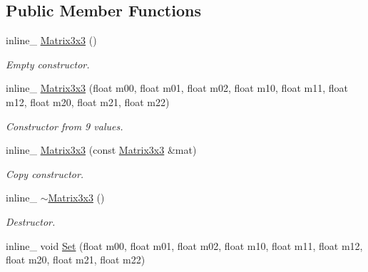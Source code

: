 \subsection*{Public Member Functions}
\begin{DoxyCompactItemize}
\item 
inline\+\_\+ \hyperlink{classOpcode_1_1Matrix3x3_ae41096c213798561be72fc6445343dc2}{Matrix3x3} ()\hypertarget{classOpcode_1_1Matrix3x3_ae41096c213798561be72fc6445343dc2}{}\label{classOpcode_1_1Matrix3x3_ae41096c213798561be72fc6445343dc2}

\begin{DoxyCompactList}\small\item\em Empty constructor. \end{DoxyCompactList}\item 
inline\+\_\+ \hyperlink{classOpcode_1_1Matrix3x3_ab43ae449591252976f7c528e7da5e008}{Matrix3x3} (float m00, float m01, float m02, float m10, float m11, float m12, float m20, float m21, float m22)\hypertarget{classOpcode_1_1Matrix3x3_ab43ae449591252976f7c528e7da5e008}{}\label{classOpcode_1_1Matrix3x3_ab43ae449591252976f7c528e7da5e008}

\begin{DoxyCompactList}\small\item\em Constructor from 9 values. \end{DoxyCompactList}\item 
inline\+\_\+ \hyperlink{classOpcode_1_1Matrix3x3_a1a094bb5a722baa07ef3785b36131be9}{Matrix3x3} (const \hyperlink{classOpcode_1_1Matrix3x3}{Matrix3x3} \&mat)\hypertarget{classOpcode_1_1Matrix3x3_a1a094bb5a722baa07ef3785b36131be9}{}\label{classOpcode_1_1Matrix3x3_a1a094bb5a722baa07ef3785b36131be9}

\begin{DoxyCompactList}\small\item\em Copy constructor. \end{DoxyCompactList}\item 
inline\+\_\+ \hyperlink{classOpcode_1_1Matrix3x3_a06439046ba59889b65a2ccef6ba25659}{$\sim$\+Matrix3x3} ()\hypertarget{classOpcode_1_1Matrix3x3_a06439046ba59889b65a2ccef6ba25659}{}\label{classOpcode_1_1Matrix3x3_a06439046ba59889b65a2ccef6ba25659}

\begin{DoxyCompactList}\small\item\em Destructor. \end{DoxyCompactList}\item 
inline\+\_\+ void \hyperlink{classOpcode_1_1Matrix3x3_a188b1bca21501c1af0fcf612c5e9ac4a}{Set} (float m00, float m01, float m02, float m10, float m11, float m12, float m20, float m21, float m22)\hypertarget{classOpcode_1_1Matrix3x3_a188b1bca21501c1af0fcf612c5e9ac4a}{}\label{classOpcode_1_1Matrix3x3_a188b1bca21501c1af0fcf612c5e9ac4a}


\end{DoxyCompactItemize}
